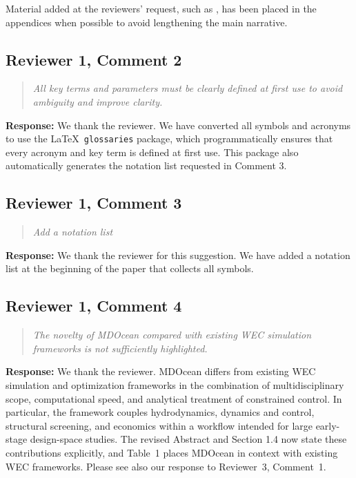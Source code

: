 \documentclass[11pt]{article}
\newcommand{\rcomment}[2]{\subsection*{#1}\begin{quote}\itshape #2\end{quote}}
\newcommand{\response}{\noindent\textbf{Response:} }
\begin{document}
Material added at the reviewers' request, such as , has been placed in the appendices when possible to avoid lengthening the main narrative.

\rcomment{Reviewer 1, Comment 2}{All key terms and parameters must be clearly defined at first use to avoid ambiguity and improve clarity.}
\response We thank the reviewer.
We have converted all symbols and acronyms to use the \LaTeX~\texttt{glossaries} package, which programmatically ensures that every acronym and key term is defined at first use.
This package also automatically generates the notation list requested in Comment 3.

\rcomment{Reviewer 1, Comment 3}{Add a notation list}
\response We thank the reviewer for this suggestion.
We have added a notation list at the beginning of the paper that collects all symbols.

\rcomment{Reviewer 1, Comment 4}{The novelty of MDOcean compared with existing WEC simulation frameworks is not sufficiently highlighted.}
\response We thank the reviewer.
MDOcean differs from existing WEC simulation and optimization frameworks in the combination of multidisciplinary scope, computational speed, and analytical treatment of constrained control.
In particular, the framework couples hydrodynamics, dynamics and control, structural screening, and economics within a workflow intended for large early-stage design-space studies.
The revised Abstract and Section 1.4 now state these contributions explicitly,
and Table~1 places MDOcean in context with existing WEC frameworks.
Please see also our response to Reviewer~3, Comment~1.
\end{document}
